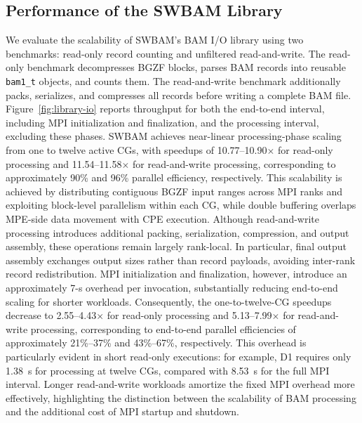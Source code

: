 \documentclass[lettersize,journal]{IEEEtran}
\begin{document}
\subsection{Performance of the SWBAM Library}
We evaluate the scalability of SWBAM's BAM I/O library using two benchmarks: read-only record counting and unfiltered read-and-write. 
The read-only benchmark decompresses BGZF blocks, parses BAM records into reusable \texttt{bam1\_t} objects, and counts them. 
The read-and-write benchmark additionally packs, serializes, and compresses all records before writing a complete BAM file. 
Figure~\ref{fig:library-io} reports throughput for both the end-to-end interval, including MPI initialization and finalization, and the processing interval, excluding these phases.
SWBAM achieves near-linear processing-phase scaling from one to twelve active CGs, with speedups of 10.77--10.90$\times$ for read-only processing and 11.54--11.58$\times$ for read-and-write processing, corresponding to approximately 90\% and 96\% parallel efficiency, respectively. 
This scalability is achieved by distributing contiguous BGZF input ranges across MPI ranks and exploiting block-level parallelism within each CG, while double buffering overlaps MPE-side data movement with CPE execution. 
Although read-and-write processing introduces additional packing, serialization, compression, and output assembly, these operations remain largely rank-local. 
In particular, final output assembly exchanges output sizes rather than record payloads, avoiding inter-rank record redistribution. 
MPI initialization and finalization, however, introduce an approximately 7-s overhead per invocation, substantially reducing end-to-end scaling for shorter workloads. 
Consequently, the one-to-twelve-CG speedups decrease to 2.55--4.43$\times$ for read-only processing and 5.13--7.99$\times$ for read-and-write processing, corresponding to end-to-end parallel efficiencies of approximately 21\%--37\% and 43\%--67\%, respectively. 
This overhead is particularly evident in short read-only executions: for example, D1 requires only 1.38~s for processing at twelve CGs, compared with 8.53~s for the full MPI interval. 
Longer read-and-write workloads amortize the fixed MPI overhead more effectively, highlighting the distinction between the scalability of BAM processing and the additional cost of MPI startup and shutdown.
\end{document}
